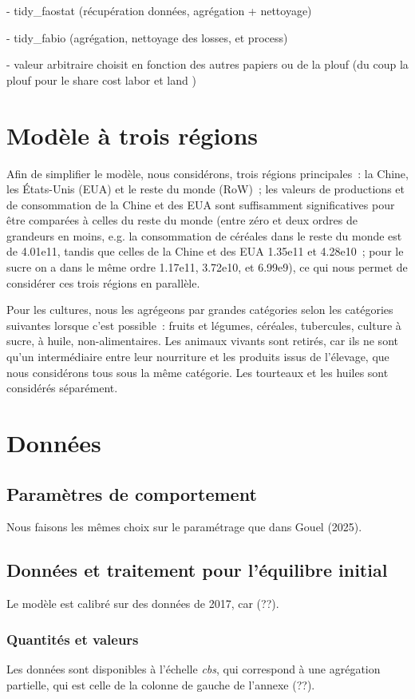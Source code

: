 - tidy\_faostat (récupération données, agrégation + nettoyage)

- tidy\_fabio (agrégation, nettoyage des losses, et process)

- valeur arbitraire choisit en fonction des autres papiers ou de la plouf (du coup la plouf pour le share cost labor et land )

\section{Modèle à trois régions}
Afin de simplifier le modèle, nous considérons, trois régions principales~: la Chine, les États-Unis (EUA) et le reste du monde (RoW)~; les valeurs de productions et de consommation de la Chine et des EUA sont suffisamment significatives pour être comparées à celles du reste du monde (entre zéro et deux ordres de grandeurs en moins, e.g. la consommation de céréales dans le reste du monde est de 4.01e11, tandis que celles de la Chine et des EUA 1.35e11 et 4.28e10~; pour le sucre on a dans le même ordre 1.17e11, 3.72e10, et 6.99e9), ce qui nous permet de considérer ces trois régions en parallèle.

Pour les cultures, nous les agrégeons par grandes catégories selon les catégories suivantes lorsque c’est possible~: fruits et légumes, céréales, tubercules, culture à sucre, à huile, non-alimentaires. Les animaux vivants sont retirés, car ils ne sont qu’un intermédiaire entre leur nourriture et les produits issus de l’élevage, que nous considérons tous sous la même catégorie. Les tourteaux et les huiles sont considérés séparément.


\section{Données}
\subsection{Paramètres de comportement}
Nous faisons les mêmes choix sur le paramétrage que dans Gouel (2025).

\subsection{Données et traitement pour l’équilibre initial}

Le modèle est calibré sur des données de 2017, car (??).


\subsubsection{Quantités et valeurs}
Les données sont disponibles à l'échelle \textit{cbs}, qui correspond à une agrégation partielle, qui est celle de la colonne de gauche de l'annexe (??).

